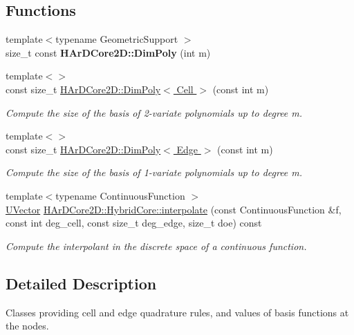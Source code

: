 \subsection*{Functions}
\begin{DoxyCompactItemize}
\item 
\mbox{\label{group__HybridCore_gab6ece52a0724f8ea46bb2e11667444a7}} 
{\footnotesize template$<$typename Geometric\+Support $>$ }\\size\+\_\+t const {\bfseries H\+Ar\+D\+Core2\+D\+::\+Dim\+Poly} (int m)
\item 
{\footnotesize template$<$$>$ }\\const size\+\_\+t \hyperlink{group__HybridCore_ga320f4be89026a2059fe48d1286a9aebf}{H\+Ar\+D\+Core2\+D\+::\+Dim\+Poly$<$ Cell $>$} (const int m)
\begin{DoxyCompactList}\small\item\em Compute the size of the basis of 2-\/variate polynomials up to degree m. \end{DoxyCompactList}\item 
{\footnotesize template$<$$>$ }\\const size\+\_\+t \hyperlink{group__HybridCore_gaf6de69a77fb6e18b5a92cb09766d50dc}{H\+Ar\+D\+Core2\+D\+::\+Dim\+Poly$<$ Edge $>$} (const int m)
\begin{DoxyCompactList}\small\item\em Compute the size of the basis of 1-\/variate polynomials up to degree m. \end{DoxyCompactList}\item 
{\footnotesize template$<$typename Continuous\+Function $>$ }\\\hyperlink{classHArDCore2D_1_1UVector}{U\+Vector} \hyperlink{group__HybridCore_ga7d6af50952aa59143ac364dd1dc4118e}{H\+Ar\+D\+Core2\+D\+::\+Hybrid\+Core\+::interpolate} (const Continuous\+Function \&f, const int deg\+\_\+cell, const size\+\_\+t deg\+\_\+edge, size\+\_\+t doe) const
\begin{DoxyCompactList}\small\item\em Compute the interpolant in the discrete space of a continuous function. \end{DoxyCompactList}\end{DoxyCompactItemize}


\subsection{Detailed Description}
Classes providing cell and edge quadrature rules, and values of basis functions at the nodes. 

